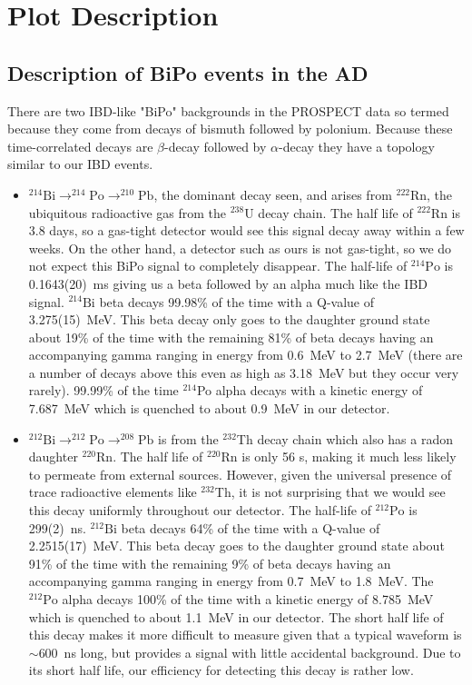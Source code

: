 




\section{Plot Description}
\subsection{Description of BiPo events in the AD}
There are two IBD-like "BiPo" backgrounds in the PROSPECT data so termed because they come from decays of bismuth followed by polonium. Because these time-correlated decays are $\beta$-decay followed by $\alpha$-decay they have a topology similar to our IBD events. 
\begin{itemize}
\item{$^{214}\textrm{Bi}\rightarrow^{214}\textrm{Po}\rightarrow^{210}\textrm{Pb}$, the dominant decay seen, and arises from $^{222}$Rn, the ubiquitous radioactive gas from the $^{238}$U decay chain. The half life of $^{222}$Rn is 3.8 days, so a gas-tight detector would see this signal decay away within a few weeks. On the other hand, a detector such as ours is not gas-tight, so we do not expect this BiPo signal to completely disappear. The half-life of $^{214}\textrm{Po}$ is 0.1643(20)~ms giving us a beta followed by an alpha much like the IBD signal. $^{214}\textrm{Bi}$ beta decays 99.98\% of the time with a Q-value of 3.275(15)~MeV. This beta decay only goes to the daughter ground state about 19\% of the time with the remaining 81\% of beta decays having an accompanying gamma ranging in energy from 0.6~MeV to 2.7~MeV (there are a number of decays above this even as high as 3.18~MeV but they occur very rarely). 99.99\% of the time $^{214}$Po alpha decays with a kinetic energy of 7.687~MeV which is quenched to about 0.9~MeV in our detector. }
\item{$^{212}\textrm{Bi}\rightarrow^{212}\textrm{Po}\rightarrow^{208}\textrm{Pb}$ is from the $^{232}$Th decay chain which also has a radon daughter $^{220}$Rn. The half life of $^{220}$Rn is only 56 s, making it much less likely to permeate from external sources. However, given the universal presence of trace radioactive elements like $^{232}$Th, it is not surprising that we would see this decay uniformly throughout our detector. The half-life of $^{212}\textrm{Po}$ is 299(2)~ns. $^{212}\textrm{Bi}$ beta decays 64\% of the time with a Q-value of 2.2515(17)~MeV. This beta decay goes to the daughter ground state about 91\% of the time with the remaining 9\% of beta decays having an accompanying gamma ranging in energy from 0.7~MeV to 1.8~MeV. The  $^{212}\textrm{Po}$ alpha decays 100\% of the time with a kinetic energy of 8.785~MeV which is quenched to about 1.1~MeV in our detector. The short half life of this decay makes it more difficult to measure given that a typical waveform is $\sim$600~ns long, but provides a signal with little accidental background. Due to its short half life, our efficiency for detecting this decay is rather low.}
\end{itemize}


